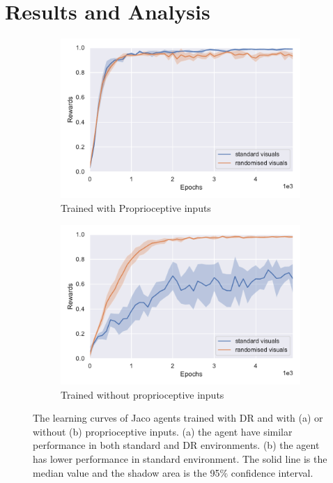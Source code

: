 \section{Results and Analysis}
\label{ch6:results}
\begin{figure}[h!]
  \centering
  \begin{subfigure}{0.49\textwidth}
    \includegraphics[width=\textwidth]{figures/chapter6/training_curves/jaco_prop.pdf}
    \caption{Trained with Proprioceptive inputs}
  \end{subfigure}\hfill
  \begin{subfigure}{0.49\textwidth}
    \includegraphics[width=\textwidth]{figures/chapter6/training_curves/jaco_noprop.pdf}
    \caption{Trained without proprioceptive inputs}
  \end{subfigure}
  \caption{The learning curves of Jaco agents trained with DR and with (a) or without (b) proprioceptive inputs. (a) the agent have similar performance in both standard and DR environments. (b) the agent has lower performance in standard environment. The solid line is the median value and the shadow area is the 95$\%$ confidence interval.}
  \label{fig:domain_shift}
\end{figure}

